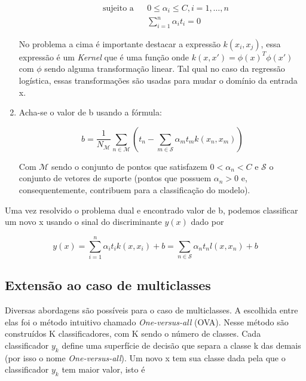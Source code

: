 \begin{enumerate}
\begin{center}
\begin{equation}
\begin{aligned}
				& \text{sujeito a}
				& & 0 \le \alpha_i \le C, i = 1, \ldots, n \\
				&&& \sum_{i = 1}^n \alpha_i t_i = 0 
				\end{aligned}
			\end{equation}
		\end{center}
	No problema a cima é importante destacar a expressão $k(x_i, x_j)$, essa expressão é um
	\textit{Kernel} que é uma função onde $k(x, x') = \phi(x)^T\phi(x')$ com $\phi$ sendo
	alguma transformação linear. Tal qual no caso da regressão logística, essas
	transformações são usadas para mudar o domínio da entrada x.
	\item Acha-se o valor de b usando a fórmula:
		\begin{center}
			\begin{equation}
				b = \frac{1}{N_{\mathcal{M}}} \sum_{n \in \mathcal{M}} \left( t_n - \sum_{m \in \mathcal{S}} \alpha_m t_m k(x_n, x_m) \right)
			\end{equation}
		\end{center}
	Com $\mathcal{M}$ sendo o conjunto de pontos que satisfazem $0 < \alpha_n < C$ e 
	$\mathcal{S}$ o conjunto de vetores de suporte (pontos que possuem $\alpha_n > 0$ e,
	consequentemente, contribuem para a classificação do modelo).
\end{enumerate}

Uma vez resolvido o problema dual e encontrado valor de b, podemos classificar um novo
x usando o sinal do discriminante $y(x)$ dado por
\begin{center}
	\begin{equation}
		y(x) = \sum_{i = 1}^n \alpha_i t_i k(x, x_i) + b = \sum_{n \in \mathcal{S}} \alpha_n t_n l(x, x_n) + b
	\end{equation}
\end{center}

\subsection{Extensão ao caso de multiclasses}

Diversas abordagens são possíveis para o caso de multiclasses. A escolhida entre elas
foi o método intuitivo chamado \textit{One-versus-all} (OVA). Nesse método são construídos
K classificadores, com K sendo o número de classes. Cada classificador $y_k$ define uma
superfície de decisão que separa a classe k das demais (por isso o nome \textit{One-versus-all}).
Um novo x tem sua classe dada pela que o classificador $y_k$ tem maior valor, isto é

